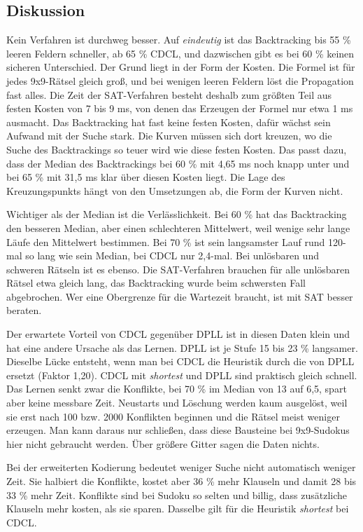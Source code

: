 \subsection{Diskussion}\label{sec:diskussion}
Kein Verfahren ist durchweg besser. Auf \emph{eindeutig} ist das Backtracking bis 55 \% leeren Feldern schneller, ab 65 \% CDCL, und dazwischen gibt es bei 60 \% keinen sicheren Unterschied. Der Grund liegt in der Form der Kosten. Die Formel ist für jedes 9x9-Rätsel gleich groß, und bei wenigen leeren Feldern löst die Propagation fast alles. Die Zeit der SAT-Verfahren besteht deshalb zum größten Teil aus festen Kosten von 7 bis 9 ms, von denen das Erzeugen der Formel nur etwa 1 ms ausmacht. Das Backtracking hat fast keine festen Kosten, dafür wächst sein Aufwand mit der Suche stark. Die Kurven müssen sich dort kreuzen, wo die Suche des Backtrackings so teuer wird wie diese festen Kosten. Das passt dazu, dass der Median des Backtrackings bei 60 \% mit 4,65 ms noch knapp unter und bei 65 \% mit 31,5 ms klar über diesen Kosten liegt. Die Lage des Kreuzungspunkts hängt von den Umsetzungen ab, die Form der Kurven nicht.

Wichtiger als der Median ist die Verlässlichkeit. Bei 60 \% hat das Backtracking den besseren Median, aber einen schlechteren Mittelwert, weil wenige sehr lange Läufe den Mittelwert bestimmen. Bei 70 \% ist sein langsamster Lauf rund 120-mal so lang wie sein Median, bei CDCL nur 2,4-mal. Bei unlösbaren und schweren Rätseln ist es ebenso. Die SAT-Verfahren brauchen für alle unlösbaren Rätsel etwa gleich lang, das Backtracking wurde beim schwersten Fall abgebrochen. Wer eine Obergrenze für die Wartezeit braucht, ist mit SAT besser beraten.

Der erwartete Vorteil von CDCL gegenüber DPLL ist in diesen Daten klein und hat eine andere Ursache als das Lernen. DPLL ist je Stufe 15 bis 23 \% langsamer. Dieselbe Lücke entsteht, wenn man bei CDCL die Heuristik durch die von DPLL ersetzt (Faktor 1,20). CDCL mit \emph{shortest} und DPLL sind praktisch gleich schnell. Das Lernen senkt zwar die Konflikte, bei 70 \% im Median von 13 auf 6,5, spart aber keine messbare Zeit. Neustarts und Löschung werden kaum ausgelöst, weil sie erst nach 100 bzw. 2000 Konflikten beginnen und die Rätsel meist weniger erzeugen. Man kann daraus nur schließen, dass diese Bausteine bei 9x9-Sudokus hier nicht gebraucht werden. Über größere Gitter sagen die Daten nichts.

Bei der erweiterten Kodierung bedeutet weniger Suche nicht automatisch weniger Zeit. Sie halbiert die Konflikte, kostet aber 36 \% mehr Klauseln und damit 28 bis 33 \% mehr Zeit. Konflikte sind bei Sudoku so selten und billig, dass zusätzliche Klauseln mehr kosten, als sie sparen. Dasselbe gilt für die Heuristik \emph{shortest} bei CDCL.

